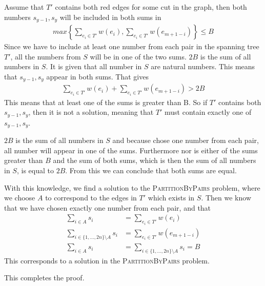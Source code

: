 Assume that $T'$ contains both red edges for some cut in the graph, then both numbers $s_{y-1}, s_y$ will be included in both sums in
\begin{align*}
    max \left\{ \sum_{e_i \in T'} w(e_i), \sum_{e_i \in T'} w(e_{m+1-i}) \right\} \leq B
\end{align*}
Since we have to include at least one number from each pair in the spanning tree $T'$, all the numbers from $S$ will be in one of the two sums. $2B$ is the sum of all numbers in $S$. It is given that all number in $S$ are natural numbers. This means that $s_{y-1}, s_y$ appear in both sums. That gives
\begin{align*}
    \sum_{e_i \in T'} w(e_i) + \sum_{e_i \in T'} w(e_{m+1-i}) > 2B
\end{align*}
This means that at least one of the sums is greater than B. So if $T'$ contains both $s_{y-1}, s_y$, then it is not a solution, meaning that $T'$ must contain exactly one of $s_{y-1}, s_y$.

$2B$ is the sum of all numbers in $S$ and because chose one number from each pair, all number will appear in one of the sums. Furthermore nor is either of the sums greater than $B$ and the sum of both sums, which is then the sum of all numbers in $S$, is equal to $2B$. From this we can conclude that both sums are equal.

With this knowledge, we find a solution to the \textsc{PartitionByPairs} problem, where we choose $A$ to correspond to the edges in $T'$ which exists in $S$. Then we know that we have chosen exactly one number from each pair, and that 
\begin{align*}
    \sum_{i \in A} s_i &= \sum_{e_i \in T'} w(e_i) \\
    \sum_{i \in \{1,\ldots,2n\}\setminus A} s_i &= \sum_{e_i \in T'} w(e_{m+1-i}) \\
    \sum_{i \in A} s_i &= \sum_{i \in \{1,\ldots,2n\}\setminus A} s_i = B
\end{align*}
This corresponds to a solution in the \textsc{PartitionByPairs} problem.

This completes the proof. 